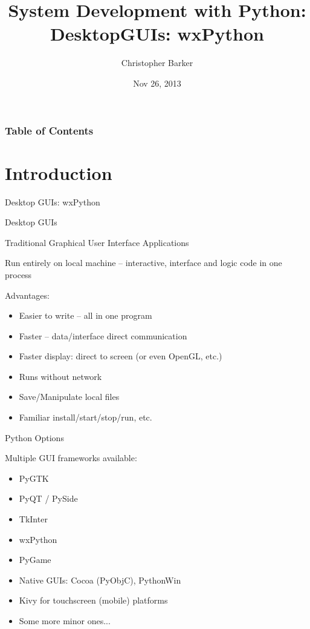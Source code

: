 \documentclass{beamer}
\title[Python Certificate: System Development]{System Development with Python:\\ DesktopGUIs: wxPython}
\author{Christopher Barker}
\institute{UW Continuing Education}
\date{Nov 26, 2013}
\begin{document}
\begin{frame}
  \titlepage
\end{frame}

\begin{frame}
\frametitle{Table of Contents}
  \tableofcontents
\end{frame}


\section{Introduction}

\begin{frame}[fragile]{Desktop GUIs: wxPython}

{\Large Desktop GUIs}

\vfill
{\large Traditional Graphical User Interface Applications}

\vfill
{\large Run entirely on local machine -- interactive, interface and logic code in one process}

\vfill

{\large Advantages:}
\begin{itemize}
   \item Easier to write -- all in one program
   \item Faster -- data/interface direct communication
   \item Faster display: direct to screen (or even OpenGL, etc.)
   \item Runs without network
   \item Save/Manipulate local files
   \item Familiar install/start/stop/run, etc. 
\end{itemize}

\end{frame} 


\begin{frame}[fragile]{Python Options}

{\Large Multiple GUI frameworks available:}

\begin{itemize}
  \item PyGTK
  \item PyQT / PySide
  \item TkInter
  \item wxPython
  \item PyGame
  \item Native GUIs: Cocoa (PyObjC), PythonWin
  \item Kivy for touchscreen (mobile) platforms
  \item Some more minor ones...
\end{itemize}

\end{frame}
\end{document}
